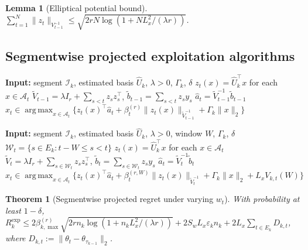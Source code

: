 \documentclass{article}
\newcommand{\cA}{\mathcal{A}}
\newcommand{\cI}{\mathcal{I}}
\DeclareMathOperator*{\argmax}{arg\,max}
\newtheorem{lemma}{Lemma}
\newtheorem{theorem}{Theorem}
\begin{document}
\begin{lemma}[Elliptical potential bound]
\label{lem:elliptical_r}
$\sum_{t=1}^N \|z_t\|_{V_{t-1}^{-1}} \le \sqrt{2rN\log(1+N L_x^2/(\lambda r))}$.
\end{lemma}

\subsection{Segmentwise projected exploitation algorithms}

\begin{algorithm}[t]
\caption{Segmentwise projected ridge-UCB in the learned subspace}
\label{alg:segment_projected_ofu}
\begin{algorithmic}[1]
\State \textbf{Input:} segment $\cI_k$, estimated basis $\widehat U_k$, $\lambda>0$, $\Gamma_k$, $\delta$
    \State $z_t(x)=\widehat U_k^\top x$ for each $x \in \cA_t$
    \State $\widetilde V_{t-1} = \lambda I_r + \sum_{s<t} z_s z_s^\top$, \; $\widetilde b_{t-1} = \sum_{s<t} z_s y_s$
    \State $\widehat a_t = \widetilde V_{t-1}^{-1}\widetilde b_{t-1}$
    \State $x_t \in \argmax_{x\in \cA_t}\{z_t(x)^\top \widehat a_t + \beta_t^{(r)}\|z_t(x)\|_{\widetilde V_{t-1}^{-1}} + \Gamma_k\|x\|_2\}$
\EndFor
\end{algorithmic}
\end{algorithm}

\begin{algorithm}[t]
\caption{Windowed projected ridge-UCB in the learned subspace}
\label{alg:windowed_projected_ofu}
\begin{algorithmic}[1]
\State \textbf{Input:} segment $\cI_k$, estimated basis $\widehat U_k$, $\lambda>0$, window $W$, $\Gamma_k$, $\delta$
    \State $\mathcal W_t = \{s\in E_k : t-W \le s < t\}$
    \State $z_t(x)=\widehat U_k^\top x$ for each $x \in \cA_t$
    \State $\widetilde V_t = \lambda I_r + \sum_{s\in \mathcal W_t} z_s z_s^\top$, \; $\widetilde b_t = \sum_{s\in \mathcal W_t} z_s y_s$
    \State $\widehat a_t = \widetilde V_t^{-1}\widetilde b_t$
    \State $x_t \in \argmax_{x\in \cA_t}\{z_t(x)^\top \widehat a_t + \beta_t^{(r,W)}\|z_t(x)\|_{\widetilde V_t^{-1}} + \Gamma_k\|x\|_2 + L_xV_{k,t}(W)\}$
\EndFor
\end{algorithmic}
\end{algorithm}

\begin{theorem}[Segmentwise projected regret under varying $w_t$]
\label{thm:segment_projected_varying}
With probability at least $1-\delta$,
$R_k^{\mathrm{exp}} \le 2\beta_{k,\max}^{(r)} \sqrt{2rn_k\log(1+n_kL_x^2/(\lambda r))} + 2S_wL_x\varepsilon_k n_k + 2L_x \sum_{t\in E_k} D_{k,t}$,
where $D_{k,t} := \|\theta_t - \theta_{\tau_{k-1}}\|_2$.
\end{theorem}
\end{document}
